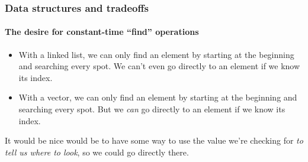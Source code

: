 \documentclass[aspectratio=169]{beamer}
\begin{document}
\begin{frame}
    \frametitle{Data structures and tradeoffs}
    \framesubtitle{The desire for constant-time ``find'' operations}

    \begin{itemize}
        \item With a linked list, we can only find an element by starting at
              the beginning and searching every spot. We can't even go directly to
              an element if we know its index.
        \item With a vector, we can only find an element by starting at the
              beginning and searching every spot. But we \emph{can} go
              directly to an element if we know its index.
    \end{itemize}

    \vspace{1em}

    It would be nice would be to have some way to use the value we're
    checking for \emph{to tell us where to look}, so we could go directly
    there.
\end{frame}
\end{document}
